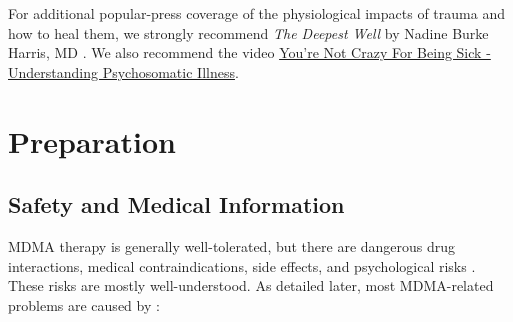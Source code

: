\documentclass[12pt,letterpaper]{book}
\begin{document}
For additional popular-press coverage of the physiological impacts of trauma and how to heal them, we strongly recommend \textit{The Deepest Well} by Nadine Burke Harris, MD \cite{harris2018deepest}. We also recommend the video \href{https://www.youtube.com/watch?v=oHoFqwF2OAU}{You're Not Crazy For Being Sick - Understanding Psychosomatic Illness}.
\chapter{Preparation}
\section{Safety and Medical Information}
\label{sec:safety}
MDMA therapy is generally well-tolerated, but there are dangerous drug interactions, medical contraindications, side effects, and psychological risks \cite{wolfgang2025}. These risks are mostly well-understood. As detailed later, most MDMA-related problems are caused by \cite{wolfgang2025,riggDeaths,roxburghDeaths}:
\end{document}
